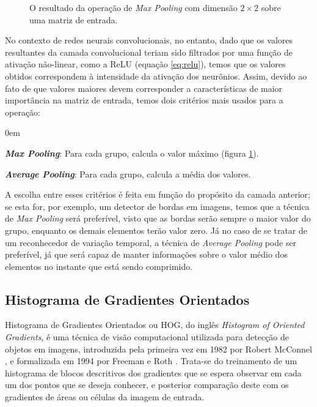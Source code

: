 \begin{figure}[ht]
    \centering
    
    \caption{O resultado da operação de \textit{Max Pooling} com dimensão $2\times2$ sobre uma matriz de entrada.}
    \label{fig:maxpool}
\end{figure}

No contexto de redes neurais convolucionais, no entanto, dado que os valores resultantes da camada convolucional teriam sido filtrados por uma função de ativação não-linear, como a ReLU (equação \ref{eq:relu}), temos que os valores obtidos correspondem à intensidade da ativação dos neurônios.
Assim, devido ao fato de que valores maiores devem corresponder a características de maior importância na matriz de entrada, temos dois critérios mais usados para a operação:

\begin{description}
    \itemsep0em 
    \item \textit{\textbf{Max Pooling}}: Para cada grupo, calcula o valor máximo (figura \ref{fig:maxpool}).
    \item \textit{\textbf{Average Pooling}}: Para cada grupo, calcula a média dos valores.
\end{description}

A escolha entre esses critérios é feita em função do propósito da camada anterior; se esta for, por exemplo, um detector de bordas em imagens, temos que a técnica de \textit{Max Pooling} será preferível, visto que as bordas serão sempre o maior valor do grupo, enquanto os demais elementos terão valor zero.
Já no caso de se tratar de um reconhecedor de variação temporal, a técnica de \textit{Average Pooling} pode ser preferível, já que será capaz de manter informações sobre o valor médio dos elementos no instante que está sendo comprimido.

\subsection{Histograma de Gradientes Orientados}
\label{sec:facialrecog}

Histograma de Gradientes Orientados ou HOG, do inglês \textit{Histogram of Oriented Gradients}, é uma técnica de visão computacional utilizada para detecção de objetos em imagens, introduzida pela primeira vez em 1982 por Robert McConnel \cite{mcconnellMethodApparatusPattern1986}, e formalizada em 1994 por Freeman e Roth \cite{freemanOrientationHistogramsHand}.
Trata-se do treinamento de um histograma de blocos descritivos dos gradientes que se espera observar em cada um dos pontos que se deseja conhecer, e posterior comparação deste com os gradientes de áreas ou células da imagem de entrada.

